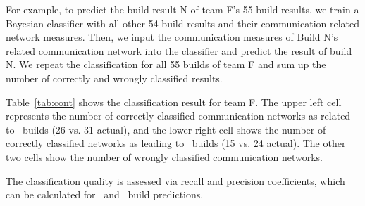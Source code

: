 For example, to predict the build result N of team F's 55 build results, we train
a Bayesian classifier with all other 54 build results and their communication
related network measures. Then, we input the communication measures of Build N's
related communication network into the classifier and predict the result of build
N. We repeat the classification for all 55 builds of team F and sum up the number
of correctly and wrongly classified results.


Table~\ref{tab:cont} shows the classification result for team F. The upper left
cell represents the number of correctly classified communication networks as
related to \ok\ builds (26 vs. 31 actual), and the lower right cell shows the
number of correctly classified networks as leading to \error\ builds (15 vs. 24
actual). The other two cells show the number of wrongly classified communication
networks.

The classification quality is assessed via recall and precision coefficients,
which can be calculated for \error\ and \ok\ build  predictions. 
%
% 


